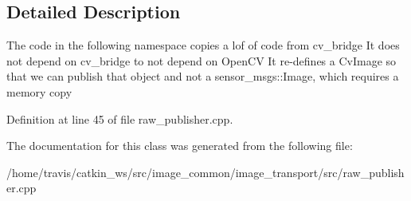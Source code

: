 \subsection{Detailed Description}
The code in the following namespace copies a lof of code from cv\-\_\-bridge It does not depend on cv\-\_\-bridge to not depend on Open\-C\-V It re-\/defines a Cv\-Image so that we can publish that object and not a sensor\-\_\-msgs\-::\-Image, which requires a memory copy 

Definition at line 45 of file raw\-\_\-publisher.\-cpp.



The documentation for this class was generated from the following file\-:\begin{DoxyCompactItemize}
\item 
/home/travis/catkin\-\_\-ws/src/image\-\_\-common/image\-\_\-transport/src/raw\-\_\-publisher.\-cpp\end{DoxyCompactItemize}
